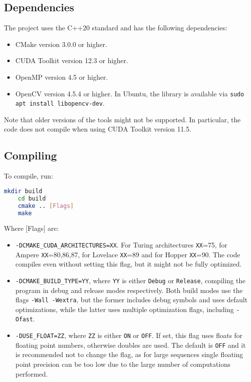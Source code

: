 \subsection{Dependencies}
The project uses the C++20 standard and has the following dependencies:
\begin{itemize}
    \item CMake version 3.0.0 or higher.
    \item CUDA Toolkit version 12.3 or higher. 
    \item OpenMP version 4.5 or higher.
    \item OpenCV version 4.5.4 or higher. In Ubuntu, the library is available via \texttt{sudo apt install libopencv-dev}.
\end{itemize}
Note that older versions of the tools might not be supported. In particular, the code does not compile when using CUDA Toolkit version 11.5.

\subsection{Compiling}
To compile, run:
\begin{lstlisting}[language=Bash]
    mkdir build
    cd build
    cmake .. [Flags]
    make
\end{lstlisting}
Where [Flags] are:
\begin{itemize}
    \item \texttt{-DCMAKE\_CUDA\_ARCHITECTURES=XX}. For Turing architectures \texttt{XX}=75, for Ampere \texttt{XX}=80,86,87, for Lovelace \texttt{XX}=89 and for Hopper \texttt{XX}=90. The code compiles even without setting this flag, but it might not be fully optimized.
    \item \texttt{-DCMAKE\_BUILD\_TYPE=YY}, where \texttt{YY} is either \texttt{Debug} or \texttt{Release}, compiling the program in debug and release modes respectively. Both build modes use the flags \texttt{-Wall -Wextra}, but the former includes debug symbols and uses default optimizations, while the latter uses multiple optimization flags, including \texttt{-Ofast}. 
    \item \texttt{-DUSE\_FLOAT=ZZ}, where \texttt{ZZ} is either \texttt{ON} or \texttt{OFF}. If set, this flag uses floats for floating point numbers, otherwise doubles are used. The default is \texttt{OFF} and it is recommended not to change the flag, as for large sequences single floating point precision can be too low due to the large number of computations performed.
\end{itemize}

